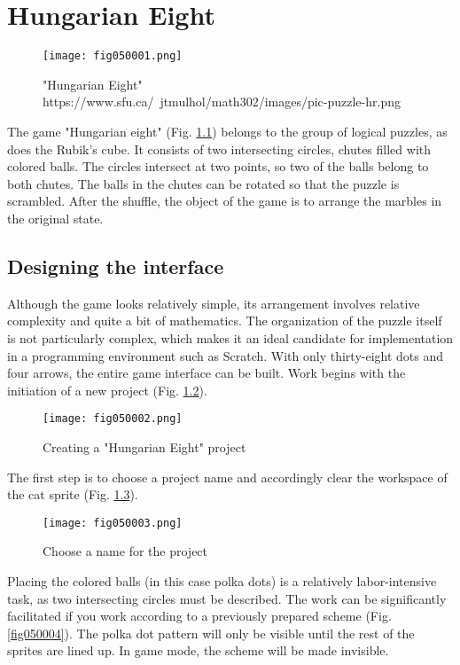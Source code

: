 ﻿\chapter{Hungarian Eight}

\begin{figure}[H]
   \centering
   \texttt{[image: fig050001.png]}
   \caption{"Hungarian Eight" \\ https://www.sfu.ca/~jtmulhol/math302/images/pic-puzzle-hr.png}
\label{fig050001}
\end{figure}

The game "Hungarian eight" (Fig. \ref{fig050001}) belongs to the group of logical puzzles, as does the Rubik's cube. It consists of two intersecting circles, chutes filled with colored balls. The circles intersect at two points, so two of the balls belong to both chutes. The balls in the chutes can be rotated so that the puzzle is scrambled. After the shuffle, the object of the game is to arrange the marbles in the original state.

\section{Designing the interface}

Although the game looks relatively simple, its arrangement involves relative complexity and quite a bit of mathematics. The organization of the puzzle itself is not particularly complex, which makes it an ideal candidate for implementation in a programming environment such as Scratch. With only thirty-eight dots and four arrows, the entire game interface can be built. Work begins with the initiation of a new project (Fig. \ref{fig050002}).

\begin{figure}[H]
   \centering
   \texttt{[image: fig050002.png]}
   \caption{Creating a "Hungarian Eight" project}
\label{fig050002}
\end{figure}

The first step is to choose a project name and accordingly clear the workspace of the cat sprite (Fig. \ref{fig050003}).

\begin{figure}[H]
   \centering
   \texttt{[image: fig050003.png]}
   \caption{Choose a name for the project}
\label{fig050003}
\end{figure}

Placing the colored balls (in this case polka dots) is a relatively labor-intensive task, as two intersecting circles must be described. The work can be significantly facilitated if you work according to a previously prepared scheme (Fig. \ref{fig050004}). The polka dot pattern will only be visible until the rest of the sprites are lined up. In game mode, the scheme will be made invisible.

